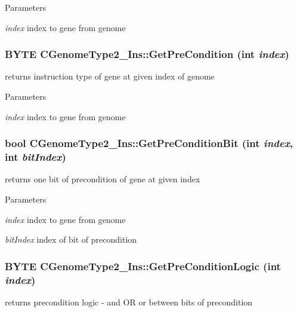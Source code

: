 \begin{DoxyParams}{Parameters}
\item[{\em index}]index to gene from genome \end{DoxyParams}
\hypertarget{classCGenomeType2__Ins_a9403187ee6f9a6095341f843e30d545d}{
\subsubsection[{GetPreCondition}]{\setlength{\rightskip}{0pt plus 5cm}BYTE CGenomeType2\_\-Ins::GetPreCondition (int {\em index})}}
\label{classCGenomeType2__Ins_a9403187ee6f9a6095341f843e30d545d}
returns instruction type of gene at given index of genome


\begin{DoxyParams}{Parameters}
\item[{\em index}]index to gene from genome \end{DoxyParams}
\hypertarget{classCGenomeType2__Ins_a9d93b1f193e5e7024e66a7ed396b1494}{
\subsubsection[{GetPreConditionBit}]{\setlength{\rightskip}{0pt plus 5cm}bool CGenomeType2\_\-Ins::GetPreConditionBit (int {\em index}, \/  int {\em bitIndex})}}
\label{classCGenomeType2__Ins_a9d93b1f193e5e7024e66a7ed396b1494}
returns one bit of precondition of gene at given index


\begin{DoxyParams}{Parameters}
\item[{\em index}]index to gene from genome \item[{\em bitIndex}]index of bit of precondition \end{DoxyParams}
\hypertarget{classCGenomeType2__Ins_aed5cc6df352196cfaa6832a6992f2757}{
\subsubsection[{GetPreConditionLogic}]{\setlength{\rightskip}{0pt plus 5cm}BYTE CGenomeType2\_\-Ins::GetPreConditionLogic (int {\em index})}}
\label{classCGenomeType2__Ins_aed5cc6df352196cfaa6832a6992f2757}
returns precondition logic -\/ and OR or between bits of precondition


